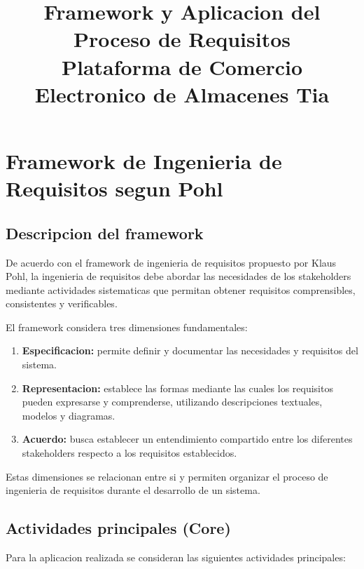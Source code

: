 \documentclass[11pt,a4paper]{article}
\title{
    \textbf{Framework y Aplicacion del Proceso de Requisitos}\\
    \large Plataforma de Comercio Electronico de Almacenes Tia
}
\begin{document}
\newpage


\section{Framework de Ingenieria de Requisitos segun Pohl}

\subsection{Descripcion del framework}

De acuerdo con el framework de ingenieria de
requisitos propuesto por Klaus Pohl, la ingenieria
de requisitos debe abordar las necesidades de los
stakeholders mediante actividades sistematicas
que permitan obtener requisitos comprensibles,
consistentes y verificables.

El framework considera tres dimensiones
fundamentales:

\begin{enumerate}
    \item \textbf{Especificacion:} permite definir
    y documentar las necesidades y requisitos
    del sistema.

    \item \textbf{Representacion:} establece las
    formas mediante las cuales los requisitos
    pueden expresarse y comprenderse, utilizando
    descripciones textuales, modelos y diagramas.

    \item \textbf{Acuerdo:} busca establecer un
    entendimiento compartido entre los diferentes
    stakeholders respecto a los requisitos
    establecidos.
\end{enumerate}

Estas dimensiones se relacionan entre si y permiten
organizar el proceso de ingenieria de requisitos
durante el desarrollo de un sistema.

\subsection{Actividades principales (Core)}

Para la aplicacion realizada se consideran las
siguientes actividades principales:
\end{document}
